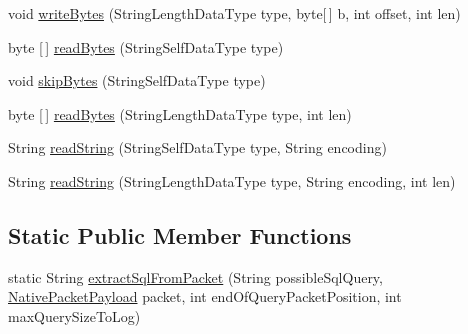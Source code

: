 \begin{DoxyCompactItemize}
\item 
void \mbox{\hyperlink{classcom_1_1mysql_1_1cj_1_1protocol_1_1a_1_1_native_packet_payload_ad5aec078f1f7185c3a4bf9cb3512cf86}{write\+Bytes}} (String\+Length\+Data\+Type type, byte\mbox{[}$\,$\mbox{]} b, int offset, int len)
\item 
byte \mbox{[}$\,$\mbox{]} \mbox{\hyperlink{classcom_1_1mysql_1_1cj_1_1protocol_1_1a_1_1_native_packet_payload_a58481f149631e0df20f8070d086dc7a1}{read\+Bytes}} (String\+Self\+Data\+Type type)
\item 
void \mbox{\hyperlink{classcom_1_1mysql_1_1cj_1_1protocol_1_1a_1_1_native_packet_payload_afea96a6e9c4a2fc5e4faf2582a0899b1}{skip\+Bytes}} (String\+Self\+Data\+Type type)
\item 
byte \mbox{[}$\,$\mbox{]} \mbox{\hyperlink{classcom_1_1mysql_1_1cj_1_1protocol_1_1a_1_1_native_packet_payload_a11abcbc7ccdaa3c84eb67d2b7f194270}{read\+Bytes}} (String\+Length\+Data\+Type type, int len)
\item 
String \mbox{\hyperlink{classcom_1_1mysql_1_1cj_1_1protocol_1_1a_1_1_native_packet_payload_a63ebde96c09048957ca95498c76d3a36}{read\+String}} (String\+Self\+Data\+Type type, String encoding)
\item 
String \mbox{\hyperlink{classcom_1_1mysql_1_1cj_1_1protocol_1_1a_1_1_native_packet_payload_ac700d17fde03d8cc82d3e04eaa7ac596}{read\+String}} (String\+Length\+Data\+Type type, String encoding, int len)
\end{DoxyCompactItemize}
\subsection*{Static Public Member Functions}
\begin{DoxyCompactItemize}
\item 
static String \mbox{\hyperlink{classcom_1_1mysql_1_1cj_1_1protocol_1_1a_1_1_native_packet_payload_a8ca35d465ee7fe7c94dc8eb828d52b82}{extract\+Sql\+From\+Packet}} (String possible\+Sql\+Query, \mbox{\hyperlink{classcom_1_1mysql_1_1cj_1_1protocol_1_1a_1_1_native_packet_payload}{Native\+Packet\+Payload}} packet, int end\+Of\+Query\+Packet\+Position, int max\+Query\+Size\+To\+Log)
\end{DoxyCompactItemize}
